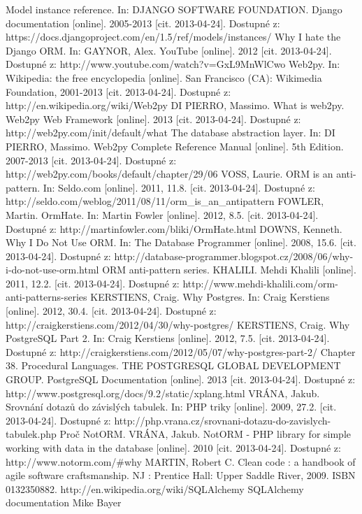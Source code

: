 \documentclass[ing,male,java,dept456]{diploma}						%
\begin{document}
\begin{thebibliography}{99}
 Model instance reference. In: DJANGO SOFTWARE FOUNDATION. Django documentation [online]. 2005-2013 [cit. 2013-04-24]. Dostupné z: https://docs.djangoproject.com/en/1.5/ref/models/instances/
 Why I hate the Django ORM. In: GAYNOR, Alex. YouTube [online]. 2012 [cit. 2013-04-24]. Dostupné z: http://www.youtube.com/watch?v=GxL9MnWlCwo
 Web2py. In: Wikipedia: the free encyclopedia [online]. San Francisco (CA): Wikimedia Foundation, 2001-2013 [cit. 2013-04-24]. Dostupné z: http://en.wikipedia.org/wiki/Web2py
 DI PIERRO, Massimo. What is web2py. Web2py Web Framework [online]. 2013 [cit. 2013-04-24]. Dostupné z: http://web2py.com/init/default/what
 The database abstraction layer. In: DI PIERRO, Massimo. Web2py Complete Reference Manual [online]. 5th Edition. 2007-2013 [cit. 2013-04-24]. Dostupné z: http://web2py.com/books/default/chapter/29/06
 VOSS, Laurie. ORM is an anti-pattern. In: Seldo.com [online]. 2011, 11.8. [cit. 2013-04-24]. Dostupné z: http://seldo.com/weblog/2011/08/11/orm\_is\_an\_antipattern
 FOWLER, Martin. OrmHate. In: Martin Fowler [online]. 2012, 8.5. [cit. 2013-04-24]. Dostupné z: http://martinfowler.com/bliki/OrmHate.html
 DOWNS, Kenneth. Why I Do Not Use ORM. In: The Database Programmer [online]. 2008, 15.6. [cit. 2013-04-24]. Dostupné z: http://database-programmer.blogspot.cz/2008/06/why-i-do-not-use-orm.html
 ORM anti-pattern series. KHALILI. Mehdi Khalili [online]. 2011, 12.2. [cit. 2013-04-24]. Dostupné z: http://www.mehdi-khalili.com/orm-anti-patterns-series
 KERSTIENS, Craig. Why Postgres. In: Craig Kerstiens [online]. 2012, 30.4. [cit. 2013-04-24]. Dostupné z: http://craigkerstiens.com/2012/04/30/why-postgres/
 KERSTIENS, Craig. Why PostgreSQL Part 2. In: Craig Kerstiens [online]. 2012, 7.5. [cit. 2013-04-24]. Dostupné z: http://craigkerstiens.com/2012/05/07/why-postgres-part-2/
 Chapter 38. Procedural Languages. THE POSTGRESQL GLOBAL DEVELOPMENT GROUP. PostgreSQL Documentation [online]. 2013 [cit. 2013-04-24]. Dostupné z: http://www.postgresql.org/docs/9.2/static/xplang.html
 VRÁNA, Jakub. Srovnání dotazů do závislých tabulek. In: PHP triky [online]. 2009, 27.2. [cit. 2013-04-24]. Dostupné z: http://php.vrana.cz/srovnani-dotazu-do-zavislych-tabulek.php
 Proč NotORM. VRÁNA, Jakub. NotORM - PHP library for simple working with data in the database [online]. 2010 [cit. 2013-04-24]. Dostupné z: http://www.notorm.com/\#why
 MARTIN, Robert C. Clean code : a handbook of agile software craftsmanship. NJ : Prentice Hall: Upper Saddle River, 2009. ISBN 0132350882.
 http://en.wikipedia.org/wiki/SQLAlchemy
 SQLAlchemy documentation Mike Bayer
\end{thebibliography}
\end{document}
